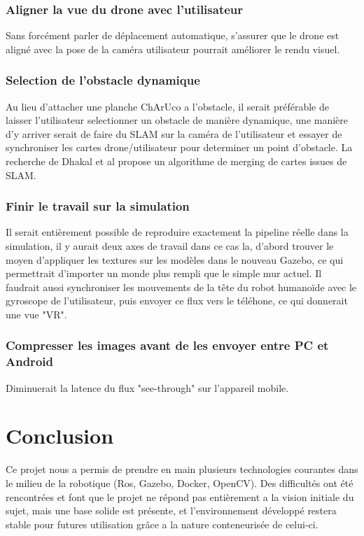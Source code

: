 \documentclass{article}
\begin{document}
\subsubsection*{Aligner la vue du drone avec l'utilisateur} Sans forc\'ement parler de d\'eplacement automatique, s'assurer que le drone est align\'e avec la pose de la cam\'era utilisateur pourrait am\'eliorer le rendu visuel.
\subsubsection*{Selection de l'obstacle dynamique}
Au lieu d'attacher une planche ChArUco a l'obstacle, il serait pr\'ef\'erable de laisser l'utilisateur selectionner un obstacle de mani\`ere dynamique, une mani\`ere d'y arriver serait de faire du SLAM sur la cam\'era de l'utilisateur et essayer de synchroniser les cartes drone/utilisateur pour determiner un point d'obstacle. La recherche de Dhakal et al\cite{dhakal2022slam} propose un algorithme de merging de cartes issues de SLAM.
\subsubsection*{Finir le travail sur la simulation}
 Il serait enti\`erement possible de reproduire exactement la pipeline r\'eelle dans la simulation, il y aurait deux axes de travail dans ce cas la, d'abord trouver le moyen d'appliquer les textures sur les mod\`eles dans le nouveau Gazebo, ce qui permettrait d'importer un monde plus rempli que le simple mur actuel. Il faudrait aussi synchroniser les mouvements de la t\^ete du robot humano\"ide avec le gyroscope de l'utilisateur, puis envoyer ce flux vers le t\'el\'ehone, ce qui donnerait une vue "VR".
\subsubsection*{Compresser les images avant de les envoyer entre PC et Android}
 Diminuerait la latence du flux "see-through" sur l'appareil mobile.
 
\section*{Conclusion}
Ce projet nous a permis de prendre en main plusieurs technologies courantes dans
le milieu de la robotique (Ros, Gazebo, Docker, OpenCV). Des difficult\'es ont
\'et\'e rencontr\'ees et font que le projet ne r\'epond pas enti\`erement a la
vision initiale du sujet, mais une base solide est pr\'esente, et
l'environnement d\'evelopp\'e restera stable pour futures utilisation gr\^ace a la nature conteneuris\'ee de celui-ci.

 
\end{document}
